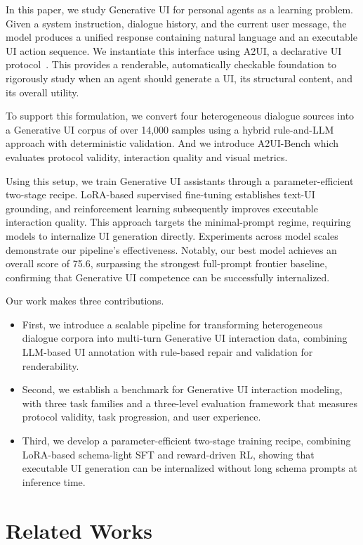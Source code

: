 \documentclass{llmxive}
\begin{document}
In this paper, we study Generative UI for personal agents as a learning problem. Given a system instruction, dialogue history, and the current user message, the model produces a unified response containing natural language and an executable UI action sequence. We instantiate this interface using A2UI, a declarative UI protocol~\citep{a2ui_v08}. This provides a renderable, automatically checkable foundation to rigorously study when an agent should generate a UI, its structural content, and its overall utility.

To support this formulation, we convert four heterogeneous dialogue sources into a Generative UI corpus of over 14,000 samples using a hybrid rule-and-LLM approach with deterministic validation. And we introduce A2UI-Bench which evaluates protocol validity, interaction quality and visual metrics.

Using this setup, we train Generative UI assistants through a parameter-efficient two-stage recipe. LoRA-based supervised fine-tuning establishes text-UI grounding, and reinforcement learning subsequently improves executable interaction quality. This approach targets the minimal-prompt regime, requiring models to internalize UI generation directly. Experiments across model scales demonstrate our pipeline's effectiveness.
Notably, our best model achieves an overall score of 75.6, surpassing the strongest full-prompt frontier baseline, confirming that Generative UI competence can be successfully internalized.

Our work makes three contributions. 

\begin{itemize}
    \item First, we introduce a scalable pipeline for transforming heterogeneous dialogue corpora into multi-turn Generative UI interaction data, combining LLM-based UI annotation with rule-based repair and validation for renderability.
    \item Second, we establish a benchmark for Generative UI interaction modeling, with three task families and a three-level evaluation framework that measures protocol validity, task progression, and user experience.
    \item Third, we develop a parameter-efficient two-stage training recipe, combining LoRA-based schema-light SFT and reward-driven RL, showing that executable UI generation can be internalized without long schema prompts at inference time.
\end{itemize}

\section{Related Works}
\end{document}
